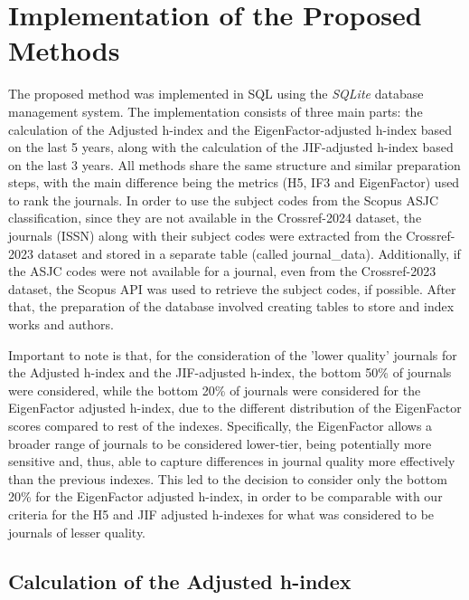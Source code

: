 \section{Implementation of the Proposed Methods}

The proposed method was implemented in SQL using the \emph{SQLite} database
management system. The implementation consists of three main parts: the
calculation of the Adjusted h-index and the EigenFactor-adjusted h-index based
on the last 5 years, along with the calculation of the JIF-adjusted h-index
based on the last 3 years. All methods share the same structure and similar
preparation steps, with the main difference being the metrics (H5, IF3 and
EigenFactor) used to rank the journals. In order to use the subject codes from
the Scopus ASJC classification, since they are not available in the
Crossref-2024 dataset, the journals (ISSN) along with their subject codes were
extracted from the Crossref-2023 dataset and stored in a separate table (called
journal\_data). Additionally, if the ASJC codes were not available for a
journal, even from the Crossref-2023 dataset, the Scopus API was used to
retrieve the subject codes, if possible. After that, the preparation of the
database involved creating tables to store and index works and authors.

Important to note is that, for the consideration of the 'lower quality'
journals for the Adjusted h-index and the JIF-adjusted h-index, the bottom 50\%
of journals were considered, while the bottom 20\% of journals were considered
for the EigenFactor adjusted h-index, due to the different distribution of the
EigenFactor scores compared to rest of the indexes. Specifically, the
EigenFactor allows a broader range of journals to be considered lower-tier,
being potentially more sensitive and, thus, able to capture differences in
journal quality more effectively than the previous indexes. This led to the
decision to consider only the bottom 20\% for the EigenFactor adjusted h-index,
in order to be comparable with our criteria for the H5 and JIF adjusted
h-indexes for what was considered to be journals of lesser quality.

\subsection{Calculation of the Adjusted h-index}

